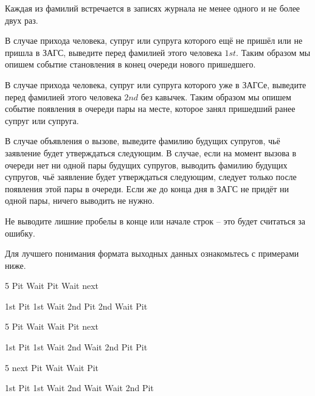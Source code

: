 Каждая из фамилий встречается в записях журнала не менее одного и не более двух раз.

\outputfmtSection

В случае прихода человека, супруг или супруга которого ещё не пришёл или не пришла в ЗАГС,
выведите перед фамилией этого человека $1st$.
Таким образом мы опишем событие становления в конец очереди нового пришедшего.

В случае прихода человека, супруг или супруга которого уже в ЗАГСе,
выведите перед фамилией этого человека $2nd$ без кавычек.
Таким образом мы опишем событие появления в очереди пары на месте,
которое занял пришедший ранее супруг или супруга.

В случае объявления о вызове, выведите фамилию будущих супругов,
чьё заявление будет утверждаться следующим.
В случае, если на момент вызова в очереди нет ни одной пары будущих супругов,
выводить фамилию будущих супругов, чьё заявление будет утверждаться следующим,
следует только после появления этой пары в очереди.
Если же до конца дня в ЗАГС не придёт ни одной пары, ничего выводить не нужно.

Не выводите лишние пробелы в конце или начале строк -- это будет считаться за ошибку.

Для лучшего понимания формата выходных данных ознакомьтесь с примерами ниже.

\exampleSection


\begin{myverbbox}[\small]{\vinput}
5
Pit
Wait
Pit
Wait
next
\end{myverbbox}
\begin{myverbbox}[\small]{\voutput}
1st Pit
1st Wait
2nd Pit
2nd Wait
Pit
\end{myverbbox}


\begin{myverbbox}[\small]{\vinput}
5
Pit
Wait
Wait
Pit
next
\end{myverbbox}
\begin{myverbbox}[\small]{\voutput}
1st Pit
1st Wait
2nd Wait
2nd Pit
Pit
\end{myverbbox}


\begin{myverbbox}[\small]{\vinput}
5
next
Pit
Wait
Wait
Pit
\end{myverbbox}
\begin{myverbbox}[\small]{\voutput}
1st Pit
1st Wait
2nd Wait
Wait
2nd Pit
\end{myverbbox}

